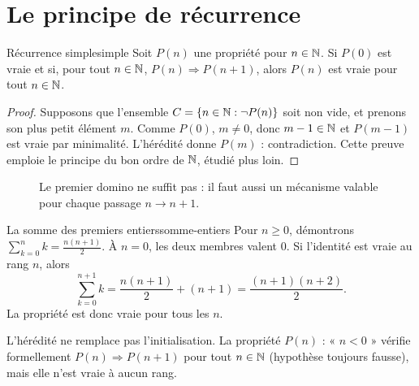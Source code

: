 \section{Le principe de récurrence}
\begin{theoreme}{Récurrence simple}{simple}
Soit $P(n)$ une propriété pour $n\in\mathbb N$. Si $P(0)$ est vraie et si, pour tout $n\in\mathbb N$, $P(n)\Rightarrow P(n+1)$, alors $P(n)$ est vraie pour tout $n\in\mathbb N$.
\end{theoreme}
\begin{proof}
Supposons que l'ensemble $C=\{n\in\mathbb N:\neg P(n)\}$ soit non vide, et prenons son plus petit élément $m$. Comme $P(0)$, $m\ne0$, donc $m-1\in\mathbb N$ et $P(m-1)$ est vraie par minimalité. L'hérédité donne $P(m)$ : contradiction. Cette preuve emploie le principe du bon ordre de $\mathbb N$, étudié plus loin.
\end{proof}
\begin{figure}[htbp]\centering
{}
\caption{Le premier domino ne suffit pas : il faut aussi un mécanisme valable pour chaque passage $n\to n+1$.}
\end{figure}
\begin{exemple}{La somme des premiers entiers}{somme-entiers}
Pour $n\ge0$, démontrons $\sum_{k=0}^n k=\frac{n(n+1)}2$. À $n=0$, les deux membres valent $0$. Si l'identité est vraie au rang $n$, alors
\[
\sum_{k=0}^{n+1}k=\frac{n(n+1)}2+(n+1)=\frac{(n+1)(n+2)}2.
\]
La propriété est donc vraie pour tous les $n$.
\end{exemple}
\begin{attention}
L'hérédité ne remplace pas l'initialisation. La propriété $P(n)$ : « $n<0$ » vérifie formellement $P(n)\Rightarrow P(n+1)$ pour tout $n\in\mathbb N$ (hypothèse toujours fausse), mais elle n'est vraie à aucun rang.
\end{attention}

